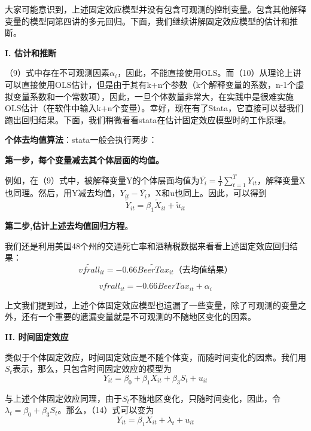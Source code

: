\documentclass[cn,12pt,math=newtx,citestyle=gb7714-2015,bibstyle=gb7714-2015]{elegantbook}
\begin{document}
大家可能意识到，上述固定效应模型并没有包含可观测的控制变量。包含其他解释变量的模型同第四讲的多元回归。下面，我们继续讲解固定效应模型的估计和推断。

\textbf{I. 估计和推断}

（9）式中存在不可观测因素$\alpha_i$，因此，不能直接使用OLS。而（10）从理论上讲可以直接使用OLS估计，但是由于其有k+n个参数（k个解释变量的系数，n-1个虚拟变量系数和一个常数项），因此，一旦个体数量非常大，在实践中是很难实施OLS估计（在软件中输入k+n个变量）。幸好，现在有了Stata，它直接可以替我们跑出回归结果。下面，我们稍微看看stata在估计固定效应模型时的工作原理。

\textbf{个体去均值算法}：stata一般会执行两步：

\textbf{第一步，每个变量减去其个体层面的均值。}

例如，在（9）式中，被解释变量Y的个体层面均值为$\overline{Y_i}=\frac{1}{T}\sum_{t=1}^{T}Y_{it}$，解释变量X也同理。然后，用Y减去均值，$Y_{it}-\overline{Y_i}$，X和u也同上。因此，可以得到
\begin{equation}
	\tilde{Y}_{it}=\beta_{1}\tilde{X}_{it}+\tilde{u}_{it}
\end{equation}

\textbf{第二步,估计上述去均值回归方程}。

我们还是利用美国48个州的交通死亡率和酒精税数据来看看上述固定效应回归结果：
\begin{equation}
	\tilde{vfrall}_{it}=-0.66\tilde{BeerTax}_{it}（去均值结果）
\end{equation}

\begin{equation}
	vfrall_{it}=-0.66BeerTax_{it}+\alpha_i
\end{equation}

上文我们提到过，上述个体固定效应模型也遗漏了一些变量，除了可观测的变量之外，还有一个重要的遗漏变量就是不可观测的不随地区变化的因素。

\textbf{II. 时间固定效应}

类似于个体固定效应，时间固定效应是不随个体变，而随时间变化的因素。我们用$S_t$表示，那么，只包含时间固定效应的模型为
\begin{equation}
	Y_{it}=\beta_{0}+\beta_{1}X_{it}+\beta_{3}S_t+u_{it}
\end{equation}

与上述个体固定效应同理，由于$S_t$不随地区变化，只随时间变化，因此，令$\lambda_t=\beta_{0}+\beta_{3}S_t$。那么，（14）式可以变为
\begin{equation}
	Y_{it}=\beta_{1}X_{it}+\lambda_t+u_{it}
\end{equation}
\end{document}
